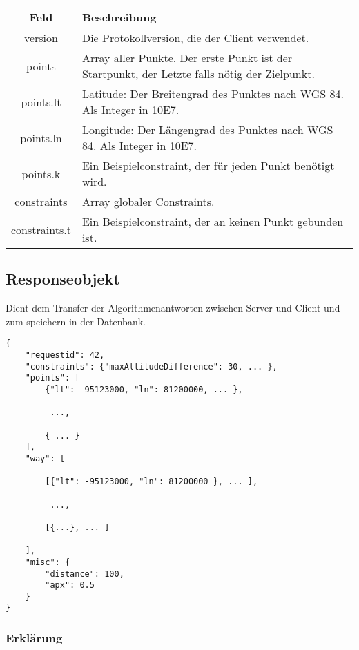 \documentclass[ngerman,titlepage,parskip=true]{scrartcl}
\begin{document}
	    \noindent \begin{tabular}{|c|p{12cm}|}
	    	\hline
	    	\textbf{Feld} & \textbf{Beschreibung} \\ 
	    	\hline \hline
	    	
	    	version & Die Protokollversion, die der Client verwendet.\\
	    	\hline
	    	
	    	points & Array aller Punkte. Der erste Punkt ist der Startpunkt, der Letzte falls nötig der Zielpunkt. \\ 
	    	\hline
	    	
	    	points.lt & Latitude: Der Breitengrad des Punktes nach WGS 84. Als Integer in 10E7. \\ 
	    	\hline
	    	
	    	points.ln & Longitude: Der Längengrad des Punktes nach WGS 84. Als Integer in 10E7. \\
	    	\hline
	    	
	    	points.k & Ein Beispielconstraint, der für jeden Punkt benötigt wird.\\ 
	    	\hline
	    	
	    	constraints & Array globaler Constraints.\\ 
	    	\hline
	    	
	    	constraints.t & Ein Beispielconstraint, der an keinen Punkt gebunden ist.\\ 
	    	\hline
	    \end{tabular}

\subsection{Responseobjekt}	
Dient dem Transfer der Algorithmenantworten zwischen Server und Client und zum speichern in der Datenbank. 
\label{responseobjekt}
		\begin{lstlisting}
{
	"requestid": 42,
	"constraints": {"maxAltitudeDifference": 30, ... },
	"points": [
		{"lt": -95123000, "ln": 81200000, ... },

		 ...,		
		
		{ ... }
	],
	"way": [
	
		[{"lt": -95123000, "ln": 81200000 }, ... ],
		
		 ...,
		 
		[{...}, ... ]
	
	],
	"misc": {
		"distance": 100,
		"apx": 0.5
	}
}
	\end{lstlisting}
\subsubsection*{Erklärung}
		
\end{document}
